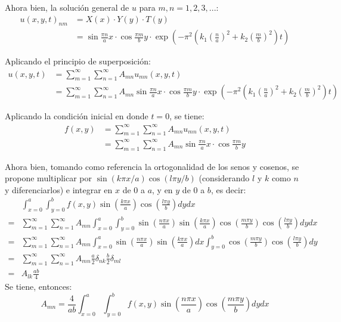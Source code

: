 \begin{solution}
Ahora bien, la solución general de $u$ para $m,n=1,2,3,...$:
\begin{align*}
    u(x,y,t)_{nm} &= X(x)\cdot Y(y)\cdot T(y)\\
             &= \sin\frac{\pi n}{a}x \cdot \cos \frac{\pi m}{b} y \cdot \exp\left(- \pi^2\left(k_1\left(\frac{ n}{a}\right)^2 +k_2\left(\frac{ m}{b}\right)^2\right)t\right)
\end{align*}

\linea 

Aplicando el principio de superposición: 
\begin{align*}
    u(x,y,t) &= \sum_{m=1}^\infty\sum_{n=1}^\infty A_{mn}u_{mn}(x,y,t)\\
    &= \sum_{m=1}^\infty\sum_{n=1}^\infty A_{mn}\sin\frac{\pi n}{a}x \cdot \cos \frac{\pi m}{b} y \cdot \exp\left(- \pi^2\left(k_1\left(\frac{ n}{a}\right)^2 +k_2\left(\frac{ m}{b}\right)^2\right)t\right)
\end{align*}

\linea 

Aplicando la condición inicial en donde $t=0$, se tiene: 
\begin{align*}
    f(x,y) &= \sum_{m=1}^\infty\sum_{n=1}^\infty A_{mn}u_{mn}(x,y,t)\\
    &= \sum_{m=1}^\infty\sum_{n=1}^\infty A_{mn}\sin\frac{\pi n}{a}x \cdot \cos \frac{\pi m}{b} y
\end{align*}

\linea 

Ahora bien, tomando como referencia la ortogonalidad de los senos  y cosenos, se propone multiplicar por $\sin (k \pi x / a) \cos (l \pi y / b)$ (considerando $l$ y $k$ como $n$ y diferenciarlos) e integrar en $x$ de 0 a $a$, y en $y$ de 0 a $b$, es decir: 
$$
\begin{aligned}
& \int_{x=0}^{a} \int_{y=0}^{b} f(x, y) \sin \left(\frac{k \pi x}{a}\right) \cos \left(\frac{l \pi y}{b}\right) d y d x \\
=& \sum_{m=1}^{\infty} \sum_{n=1}^{\infty} A_{m n} \int_{x=0}^{a} \int_{y=0}^{b} \sin \left(\frac{n \pi x}{a}\right) \sin \left(\frac{k \pi x}{a}\right) \cos \left(\frac{m \pi y}{b}\right) \cos \left(\frac{l \pi y}{b}\right) d y d x \\
=& \sum_{m=1}^{\infty} \sum_{n=1}^{\infty} A_{m n} \int_{x=0}^{a} \sin \left(\frac{n \pi x}{a}\right) \sin \left(\frac{k \pi x}{a}\right) d x \int_{y=0}^{b} \cos \left(\frac{m \pi y}{b}\right) \cos \left(\frac{l \pi y}{b}\right) d y \\
=& \sum_{m=1}^{\infty} \sum_{n=1}^{\infty} A_{m n} \frac{a}{2} \delta_{n k} \frac{b}{2} \delta_{m l} \\
=& A_{l k} \frac{ab}{4}
\end{aligned}
$$
Se tiene, entonces:
$$
A_{m n}=\frac{4}{ab} \int_{x=0}^{a} \int_{y=0}^{b} f(x, y) \sin \left(\frac{n \pi x}{a}\right) \cos \left(\frac{m \pi y}{b}\right) d y d x
$$


\end{solution}
